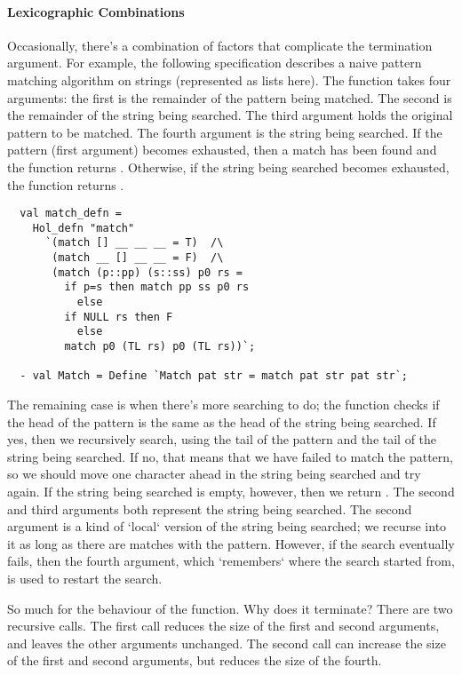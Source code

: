 \paragraph{Lexicographic Combinations}

Occasionally, there's a combination of factors that complicate the
termination argument. For example, the following specification
describes a naive pattern matching algorithm on strings (represented
as lists here). The function takes four arguments: the first is the
remainder of the pattern being matched. The second is the remainder of
the string being searched.  The third argument holds the original
pattern to be matched. The fourth argument is the string being
searched. If the pattern (first argument) becomes exhausted, then a
match has been found and the function returns . Otherwise, if the
string being searched becomes exhausted, the function returns .
%
\setcounter{sessioncount}{0}
\begin{session}
\begin{hol}
\begin{verbatim}
  val match_defn =
    Hol_defn "match"
      `(match [] __ __ __ = T)  /\
       (match __ [] __ __ = F)  /\
       (match (p::pp) (s::ss) p0 rs =
         if p=s then match pp ss p0 rs 
           else
         if NULL rs then F
           else 
         match p0 (TL rs) p0 (TL rs))`;

  - val Match = Define `Match pat str = match pat str pat str`;
\end{verbatim}
\end{hol}
\end{session}
%
The remaining case is when there's more searching to do; the function
checks if the head of the pattern is the same as the head of the
string being searched. If yes, then we recursively search, using the
tail of the pattern and the tail of the string being searched. If no,
that means that we have failed to match the pattern, so we should move
one character ahead in the string being searched and try again. If the
string being searched is empty, however, then we return \holtxt{F}. The
second and third arguments both represent the string being
searched. The second argument is a kind of `local` version of the
string being searched; we recurse into it as long as there are matches
with the pattern. However, if the search eventually fails, then the
fourth argument, which `remembers` where the search started from, is
used to restart the search.

So much for the behaviour of the function. Why does it terminate? There
are two recursive calls. The first call reduces the size of the first
and second arguments, and leaves the other arguments unchanged. The
second call can increase the size of the first and second arguments, but
reduces the size of the fourth.

